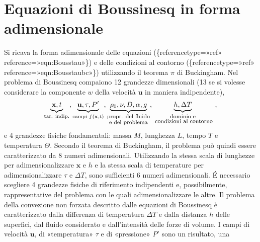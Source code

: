 \documentclass[letterpaper,10pt,italian]{jupyterBook}
\begin{document}
\section{Equazioni di Boussinesq in forma adimensionale}
\label{\detokenize{polimi/fluidmechanics-ita/template/capitoli/07_similitudine/07teoria:equazioni-di-boussinesq-in-forma-adimensionale}}
\sphinxAtStartPar
Si ricava la forma adimensionale delle equazioni
(\{reference\sphinxhyphen{}type=»ref»
reference=»eqn:Bouss\sphinxhyphen{}tau»\}) e delle condizioni al contorno
(\{reference\sphinxhyphen{}type=»ref»
reference=»eqn:Bouss\sphinxhyphen{}tau\sphinxhyphen{}bc»\}) utilizzando il teorema \(\pi\) di
Buckingham. Nel problema di Boussinesq compaiono 12 grandezze
dimensionali (13 se si volesse considerare la componente \(w\) della
velocità \(\mathbf{u}\) in maniera indipendente),
\begin{equation*}
\begin{split}\underbrace{\mathbf{x}, t}_{\text{tar. indip.}}, 
    \underbrace{\mathbf{u}, \tau, P'}_{\text{campi } f(\mathbf{x},t)},
    \underbrace{\rho_0, \nu, D, \alpha, g}_{\substack{ \text{\footnotesize{propr. del fluido}} \\ \text{\footnotesize{e del problema}} } }, 
    \underbrace{h, \Delta T}_{\substack{ \text{\footnotesize{dominio e}} \\ \text{\footnotesize{ condizioni al contorno}} } } \ ,\end{split}
\end{equation*}
\sphinxAtStartPar
e 4 grandezze fisiche fondamentali: massa \(M\), lunghezza \(L\), tempo \(T\)
e temperatura \(\Theta\). Secondo il teorema di Buckingham, il problema
può quindi essere caratterizzato da 8 numeri adimensionali. Utilizzando
la stessa scala di lunghezze per adimensionalizzare \(\mathbf{x}\) e \(h\) e la
stessa scala di temperature per adimensionalizzare \(\tau\) e \(\Delta T\),
sono sufficienti 6 numeri adimensionali. É necessario scegliere 4
grandezze fisiche di riferimento indipendenti e, possibilmente,
rappresentative del problema con le quali adimensionalizzare le altre.
Il problema della convezione non forzata descritto dalle equazioni di
Boussinesq è caratterizzato dalla differenza di temperatura \(\Delta T\) e
dalla distanza \(h\) delle superfici, dal fluido considerato e
dall’intensità delle forze di volume. I campi di velocità \(\mathbf{u}\), di
«temperatura» \(\tau\) e di «pressione» \(P'\) sono un risultato, una
\end{document}
